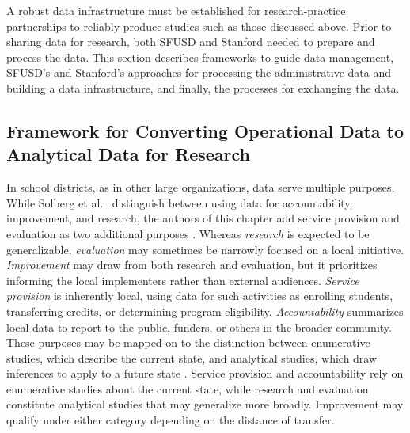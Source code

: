 A robust data infrastructure must be established for research-practice partnerships to reliably produce studies such as those discussed above. Prior to sharing data for research, both SFUSD and Stanford needed to prepare and process the data. This section describes frameworks to guide data management, SFUSD's and Stanford's approaches for processing the administrative data and building a data infrastructure, and finally, the processes for exchanging the data.

\hypertarget{framework-for-converting-operational-data-to-analytical-data-for-research}{%
\subsection{Framework for Converting Operational Data to Analytical Data for Research}\label{framework-for-converting-operational-data-to-analytical-data-for-research}}

In school districts, as in other large organizations, data serve multiple purposes. While Solberg et al.~\citeyearpar{solberg1997} distinguish between using data for accountability, improvement, and research, the authors of this chapter add service provision and evaluation as two additional purposes \citep{sanfranciscounifiedschooldistrict2019}. Whereas \emph{research} is expected to be generalizable, \emph{evaluation} may sometimes be narrowly focused on a local initiative. \emph{Improvement} may draw from both research and evaluation, but it prioritizes informing the local implementers rather than external audiences. \emph{Service provision} is inherently local, using data for such activities as enrolling students, transferring credits, or determining program eligibility. \emph{Accountability} summarizes local data to report to the public, funders, or others in the broader community. These purposes may be mapped on to the distinction between enumerative studies, which describe the current state, and analytical studies, which draw inferences to apply to a future state \citep{deming1953, provost2011}. Service provision and accountability rely on enumerative studies about the current state, while research and evaluation constitute analytical studies that may generalize more broadly. Improvement may qualify under either category depending on the distance of transfer.

